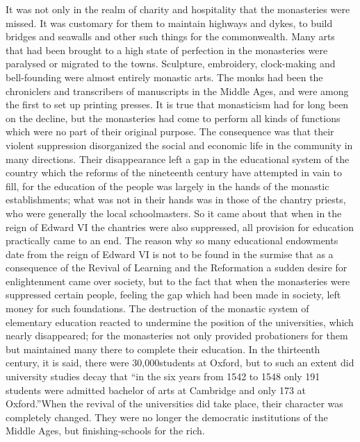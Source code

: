 \documentclass{book}
\begin{document}
It was not only in the realm of charity and hospitality that the monasteries were missed. It was customary for them to maintain highways and dykes, to build bridges and seawalls and other such things for the commonwealth. Many arts that had been brought to a high state of perfection in the monasteries were paralysed or migrated to the towns. Sculpture, embroidery, clock-making and bell-founding were almost entirely monastic arts. The monks had been the chroniclers and transcribers of manuscripts in the Middle Ages, and were among the first to set up printing presses. It is true that monasticism had for long been on the decline, but the monasteries had come to perform all kinds of functions which were no part of their original purpose. The consequence was that their violent suppression disorganized the social and economic life in the community in many directions. Their disappearance left a gap in the educational system of the country which the reforms of the nineteenth century have attempted in vain to fill, for the education of the people was largely in the hands of the monastic establishments; what was not in their hands was in those of the chantry priests, who were generally the local schoolmasters. So it came about that when in the reign of Edward VI the chantries were also suppressed, all provision for education practically came to an end. The reason why so many educational endowments date from the reign of Edward VI is not to be found in the surmise that as a consequence of the Revival of Learning and the Reformation a sudden desire for enlightenment came over society, but to the fact that when the monasteries were suppressed certain people, feeling the gap which had been made in society, left money for such foundations. The destruction of the monastic system of elementary education reacted to undermine the position of the universities, which nearly disappeared; for the monasteries not only provided probationers for them but maintained many there to complete their education. In the thirteenth century, it is said, there were 30,000\footnotemark[9] students at Oxford, but to such an extent did university studies decay that “in the six years from 1542 to 1548 only 191 students were admitted bachelor of arts at Cambridge and only 173 at Oxford.”\footnotemark[10] When the revival of the universities did take place, their character was completely changed. They were no longer the democratic institutions of the Middle Ages, but finishing-schools for the rich.
\end{document}
